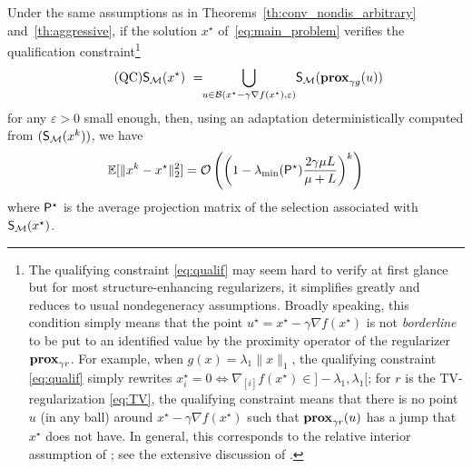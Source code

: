 \begin{theorem}\label{th:rate_identif}
Under the same assumptions as in Theorems~\ref{th:conv_nondis_arbitrary} and~\ref{th:aggressive}, if the solution $x^\star$ of~\eqref{eq:main_problem} verifies the qualification constraint\footnote{The qualifying constraint \eqref{eq:qualif} may seem hard to verify at first glance but for most structure-enhancing regularizers, it simplifies greatly and {reduces} to usual nondegeneracy {assumptions}. Broadly speaking, this condition simply means that the point $u^\star = x^\star - \gamma\nabla f(x^\star)$ is not \emph{borderline} to be put to an identified value by the proximity operator of the regularizer $\prox_{\gamma r}$. 
For example, {when} $g(x) = \lambda_1 \|x\|_1$, the qualifying constraint \eqref{eq:qualif} simply rewrites $x_i^\star = 0 \Leftrightarrow \nabla_{[i]} f(x^\star) \in ]-\lambda_1,\lambda_1[$; 
for $r$ is the TV-regularization \eqref{eq:TV}, the qualifying constraint means that there is no point $u$ (in any ball) around $x^\star - \gamma \nabla f(x^\star)$ such that $\prox_{\gamma r}(u)$ has a jump that $x^\star$ does not have. 
In general, this corresponds to the relative interior assumption of \cite{lewis2002active}; see the extensive discussion 
of \cite{vaiter2015model}.}
\begin{align}
    \label{eq:qualif}\tag{QC}
     \S(x^\star) ~=\!\! \bigcup_{u\in\mathcal{B}(x^\star-\gamma \nabla f(x^\star),\varepsilon)} \!\S(\prox_{\gamma g}(u))
\end{align}
for any $\varepsilon>0$ small enough, then, using an adaptation deterministically computed from $(\S(x^k))$, we have \begin{align*}
     \EE[\|x^k-x^\star\|_2^2] = \mathcal{O}\left( \left( 1- \lambda_{\min} (\bP^\star) \frac{2\gamma \mu L}{\mu + L}  \right)^k \right)
 \end{align*}
 where $ \bP^\star$ is the average projection matrix of the selection 
 associated with $\S(x^\star)$.
\end{theorem}

